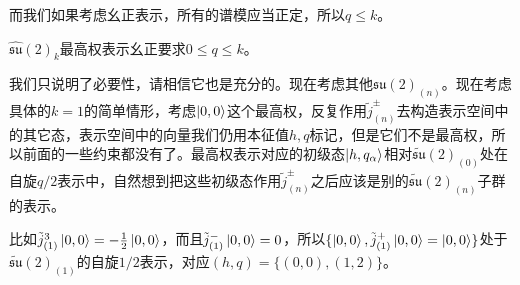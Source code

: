 而我们如果考虑幺正表示，所有的谱模应当正定，所以$q\leq k$。
\begin{theorem}
	$\widehat{\mathfrak{su}}(2)_k$最高权表示幺正要求$\boxed{0\leq q\leq k}$。
\end{theorem}
我们只说明了必要性，请相信它也是充分的。现在考虑其他$\mathfrak{su}(2)_{(n)}$。现在考虑具体的$k=1$的简单情形，考虑$\ket{0,0}$这个最高权，反复作用$\widetilde{j}_{(n)}^\pm$去构造表示空间中的其它态，表示空间中的向量我们仍用本征值$h,q$标记，但是它们不是最高权，所以前面的一些约束都没有了。最高权表示对应的初级态$\ket{h,q_\alpha}$相对$\widetilde{\mathfrak{su}}(2)_{(0)}$处在自旋$q/2$表示中，自然想到把这些初级态作用$\widetilde{j}_{(n)}^\pm$之后应该是别的$\widetilde{\mathfrak{su}}(2)_{(n)}$子群的表示。

比如$\tilde{j}_{(1)}^3\ket{0,0}=-\frac{1}{2}\ket{0,0}$，而且$\tilde{j}_{(1)}^-\ket{0,0}=0$，所以$\{\ket{0,0},\tilde{j}_{(1)}^+\ket{0,0}=\ket{0,0}\}$处于$\widetilde{\mathfrak{su}}(2)_{(1)}$的自旋$1/2$表示，对应$(h,q)=\{(0,0),(1,2)\}$。

